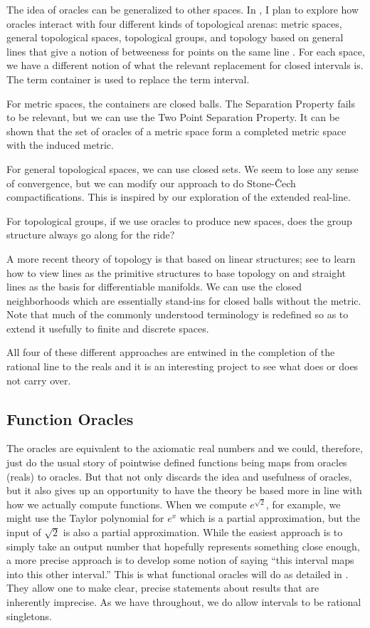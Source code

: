 \documentclass[12pt]{article}
\begin{document}
The idea of oracles can be generalized to other spaces. In \cite{taylor23metric}, I plan to explore how oracles interact with four different kinds of topological arenas: metric spaces, general topological spaces, topological groups, and topology based on general lines that give a notion of betweeness for points on the same line \cite{maudlin}. For each space, we have a different notion of what the relevant replacement for closed intervals is. The term container is used to replace the term interval.

For metric spaces, the containers are closed balls. The Separation Property fails to be relevant, but we can use the Two Point Separation Property. It can be shown that the set of oracles of a metric space form a completed metric space with the induced metric. 

For general topological spaces, we can use closed sets. We seem to lose any sense of convergence, but we can modify our approach to do Stone-\v{C}ech compactifications. This is inspired by our exploration of the extended real-line. 

For topological groups, if we use oracles to produce new spaces, does the group structure always go along for the ride? 

A more recent theory of topology is that based on linear structures; see \cite{maudlin} to learn how to view lines as the primitive structures to base topology on and straight lines as the basis for differentiable manifolds. We can use the closed neighborhoods which are essentially stand-ins for closed balls without the metric. Note that much of the commonly understood terminology is redefined so as to extend it usefully to finite and discrete spaces. 

All four of these different approaches are entwined in the completion of the rational line to the reals and it is an interesting project to see what does or does not carry over. 

\subsection{Function Oracles}

The oracles are equivalent to the axiomatic real numbers and we could, therefore, just do the usual story of pointwise defined functions being maps from oracles (reals) to oracles. But that not only discards the idea and usefulness of oracles, but it also gives up an opportunity to have the theory be based more in line with how we actually compute functions. When we compute $e^{\sqrt{2}}$, for example, we might use the Taylor polynomial for $e^x$ which is a partial approximation, but the input of $\sqrt{2}$ is also a partial approximation. While the easiest approach is to simply take an output number that hopefully represents something close enough, a more precise approach is to develop some notion of saying ``this interval maps into this other interval.'' This is what functional oracles will do as detailed in \cite{taylor23funora}. They allow one to make clear, precise statements about results that are inherently imprecise. As we have throughout, we do allow intervals to be rational singletons. 
\end{document}
